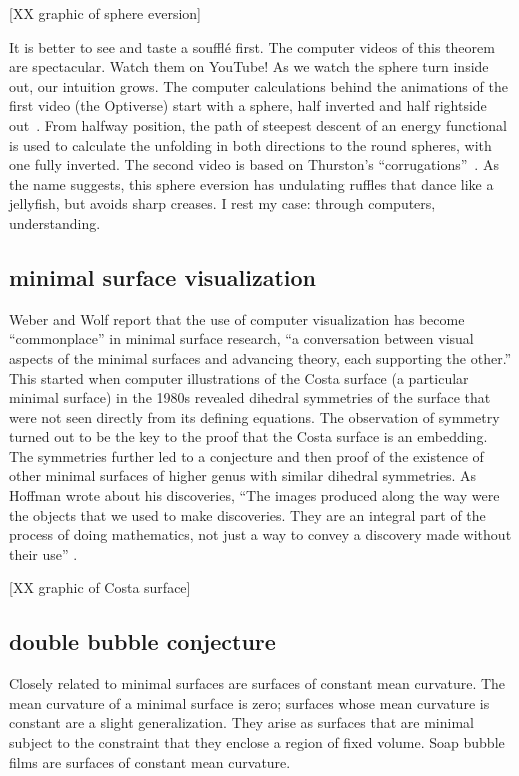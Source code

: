 \documentclass{llncs}
\begin{document}
[XX graphic of sphere eversion]

It is better to see and taste a souffl\'e first.  The computer videos
of this theorem are spectacular.  Watch them on YouTube!  As we watch
the sphere turn inside out, our intuition grows.  The computer
calculations behind the animations of the first video (the Optiverse)
start with a sphere, half inverted and half rightside out~\cite{SFL}.  From
halfway position, the path of steepest descent of an energy functional is
used to calculate the unfolding in both directions to the round spheres,
with one fully inverted.  The second video is based on Thurston's
``corrugations''~\cite{LMM}. As the name suggests, this sphere eversion has
undulating ruffles that dance like a jellyfish, but avoids sharp
creases.  I rest my case: through computers, understanding.

\subsection{minimal surface visualization} %

Weber and Wolf \cite{WW11} report that the use of computer
visualization has become ``commonplace'' in minimal surface research,
``a conversation between visual aspects of the minimal surfaces and
advancing theory, each supporting the other.''  This started when
computer illustrations of the Costa surface (a particular minimal
surface) in the 1980s revealed dihedral symmetries of the surface that
were not seen directly from its defining equations.  The observation
of symmetry turned out to be the key to the proof that the Costa
surface is an embedding.  The symmetries further led to a conjecture
and then proof of the existence of other minimal surfaces of higher
genus with similar dihedral symmetries.  As Hoffman wrote about his discoveries, ``The
images produced along the way were the objects that we used to make
discoveries. They are an integral part of the process of doing
mathematics, not just a way to convey a discovery made without their
use'' \cite{Hoffman}.

[XX graphic of Costa surface]


\subsection{double bubble conjecture}

Closely related to minimal surfaces are surfaces of constant mean
curvature.  The mean curvature of a minimal surface is zero; surfaces
whose mean curvature is constant are a slight generalization.  They
arise as surfaces that are minimal subject to the constraint that
they enclose a region of fixed volume.  Soap bubble films are
surfaces of constant mean curvature.  
\end{document}
